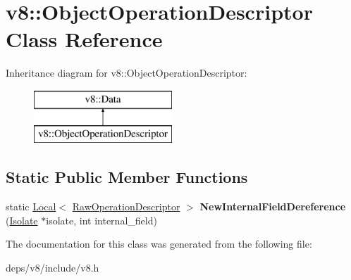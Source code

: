 \hypertarget{classv8_1_1_object_operation_descriptor}{}\section{v8\+:\+:Object\+Operation\+Descriptor Class Reference}
\label{classv8_1_1_object_operation_descriptor}
Inheritance diagram for v8\+:\+:Object\+Operation\+Descriptor\+:\begin{figure}[H]
\begin{center}
\leavevmode
\includegraphics[height=2.000000cm]{classv8_1_1_object_operation_descriptor}
\end{center}
\end{figure}
\subsection*{Static Public Member Functions}
\begin{DoxyCompactItemize}
\item 
\hypertarget{classv8_1_1_object_operation_descriptor_a5268ef439fd9f47190ccaecfd721aa12}{}static \hyperlink{classv8_1_1_local}{Local}$<$ \hyperlink{classv8_1_1_raw_operation_descriptor}{Raw\+Operation\+Descriptor} $>$ {\bfseries New\+Internal\+Field\+Dereference} (\hyperlink{classv8_1_1_isolate}{Isolate} $\ast$isolate, int internal\+\_\+field)\label{classv8_1_1_object_operation_descriptor_a5268ef439fd9f47190ccaecfd721aa12}

\end{DoxyCompactItemize}


The documentation for this class was generated from the following file\+:\begin{DoxyCompactItemize}
\item 
deps/v8/include/v8.\+h\end{DoxyCompactItemize}
